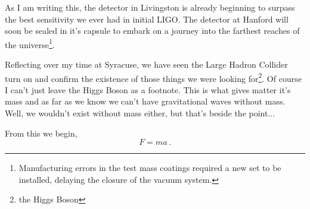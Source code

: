 As I am writing this,
the detector in Livingston is already beginning to surpass the
best sensitivity we ever had in initial LIGO. The detector at Hanford will
soon be sealed in it's capsule to embark on a journey into the farthest
reaches of the
universe\footnote{Manufacturing errors in the test mass coatings required a new
set to be installed, delaying the closure of the vacuum system.}.

Reflecting over my time at Syracuse, we have seen the Large Hadron Collider
turn on and confirm the existence of those things we were looking
for\footnote{the Higgs Boson}.
Of course I can't just leave the Higgs Boson as a footnote.
This is what gives matter it's mass and as far as we know we can't have
gravitational waves without mass.
Well, we wouldn't exist without mass either, but that's beside the point...





From this we begin,
\begin{equation}
F = ma\,.
\end{equation}

